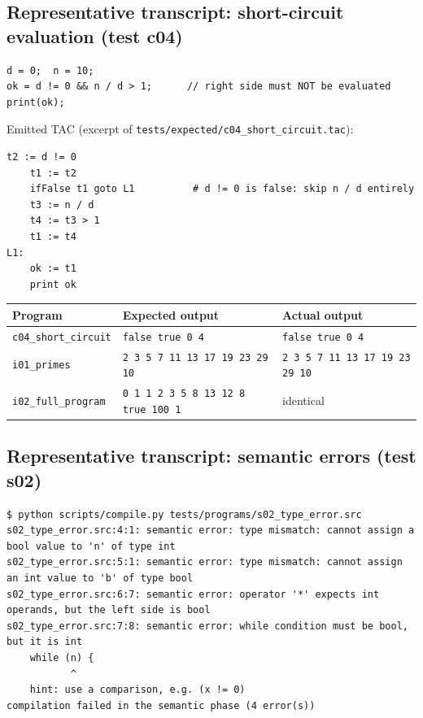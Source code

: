 \documentclass[11pt,letterpaper]{article}
\newcommand{\code}[1]{\texttt{#1}}
\begin{document}
\subsection{Representative transcript: short-circuit evaluation (test c04)}
\begin{lstlisting}[language=minilang]
d = 0;  n = 10;
ok = d != 0 && n / d > 1;      // right side must NOT be evaluated
print(ok);
\end{lstlisting}
Emitted TAC (excerpt of \code{tests/expected/c04\_short\_circuit.tac}):
\begin{lstlisting}[language=tac]
    t2 := d != 0
    t1 := t2
    ifFalse t1 goto L1          # d != 0 is false: skip n / d entirely
    t3 := n / d
    t4 := t3 > 1
    t1 := t4
L1:
    ok := t1
    print ok
\end{lstlisting}
\begin{center}\small
\begin{tabular}{lll}
\toprule
\textbf{Program} & \textbf{Expected output} & \textbf{Actual output} \\
\midrule
\code{c04\_short\_circuit} & \code{false true 0 4} & \code{false true 0 4} \\
\code{i01\_primes} & \code{2 3 5 7 11 13 17 19 23 29 10} & \code{2 3 5 7 11 13 17 19 23 29 10} \\
\code{i02\_full\_program} & \code{0 1 1 2 3 5 8 13 12 8 true 100 1} & identical \\
\bottomrule
\end{tabular}
\end{center}

\subsection{Representative transcript: semantic errors (test s02)}
\begin{lstlisting}
$ python scripts/compile.py tests/programs/s02_type_error.src
s02_type_error.src:4:1: semantic error: type mismatch: cannot assign a bool value to 'n' of type int
s02_type_error.src:5:1: semantic error: type mismatch: cannot assign an int value to 'b' of type bool
s02_type_error.src:6:7: semantic error: operator '*' expects int operands, but the left side is bool
s02_type_error.src:7:8: semantic error: while condition must be bool, but it is int
    while (n) {
           ^
    hint: use a comparison, e.g. (x != 0)
compilation failed in the semantic phase (4 error(s))
\end{lstlisting}
\end{document}

